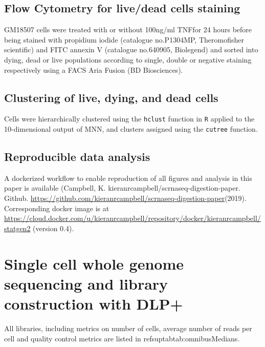 \subsection{Flow Cytometry for live/dead cells staining}
 GM18507 cells were treated with or without 100ng/ml TNF\textalpha for 24 hours before being stained with propidium iodide (catalogue no.P1304MP, Theromofisher scientific) and FITC annexin V (catalogue no.640905, Biolegend) and sorted into dying, dead or live populations according to single, double or negative staining respectively using a FACS Aria Fusion (BD Biosciences).
 
\subsection{Clustering of live, dying, and dead cells}
Cells were hierarchically clustered using the \texttt{hclust} function in \texttt{R} applied to the 10-dimensional output of MNN, and clusters assigned using the \texttt{cutree} function.

\subsection{Reproducible data analysis}
A dockerized workflow to enable reproduction of all figures and analysis in this paper is available (Campbell, K. kieranrcampbell/scrnaseq-digestion-paper. Github. \url{https://github.com/kieranrcampbell/scrnaseq-digestion-paper}(2019). Corresponding docker image is at \url{https://cloud.docker.com/u/kieranrcampbell/repository/docker/kieranrcampbell/statgen2} (version 0.4).

\section{Single cell whole genome sequencing and library construction with DLP+}

All libraries, including metrics on number of cells, average number of reads per cell and quality control metrics are listed in refsuptab{tab:omnibusMedians}.

